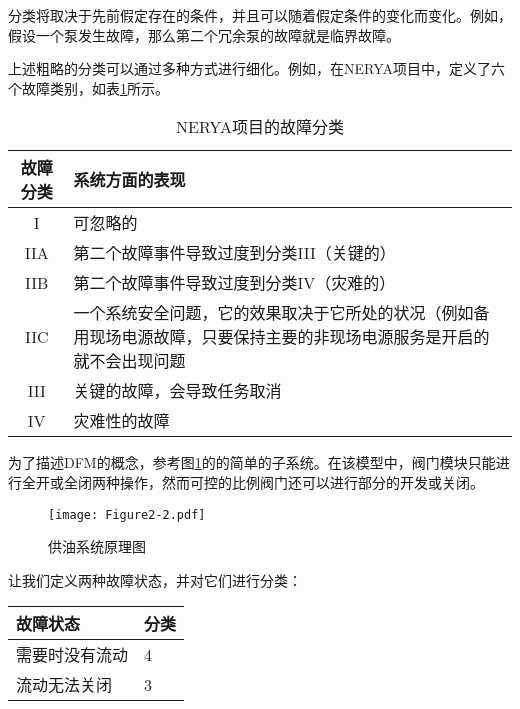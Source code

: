 \documentclass[cn,11pt,chinese]{elegantbook}
\begin{document}
分类将取决于先前假定存在的条件，并且可以随着假定条件的变化而变化。例如，假设一个泵发生故障，那么第二个冗余泵的故障就是临界故障。

上述粗略的分类可以通过多种方式进行细化。例如，在NERYA项目中，定义了六个故障类别，如表\ref{tab:tab2_3}所示。



\begin{table}[h]
\centering
	\caption{NERYA项目的故障分类}\label{tab:tab2_3}
	\begin{tabular}{c p{10cm}}
		\toprule
		故障分类 & 系统方面的表现                                                     \\ \midrule
		I    & 可忽略的                                                        \\
		IIA  & 第二个故障事件导致过度到分类III（关键的）                                      \\
		IIB  & 第二个故障事件导致过度到分类IV（灾难的）                                       \\
		IIC  & 一个系统安全问题，它的效果取决于它所处的状况（例如备用现场电源故障，只要保持主要的非现场电源服务是开启的就不会出现问题 \\
		III  & 关键的故障，会导致任务取消                                               \\
		IV   & 灾难性的故障                                                      \\ \bottomrule
	\end{tabular}
\end{table}

为了描述DFM的概念，参考图\ref{fig:fig2-2}的的简单的子系统。在该模型中，阀门模块只能进行全开或全闭两种操作，然而可控的比例阀门还可以进行部分的开发或关闭。

\begin{figure}[htpb]
	\centering
	\texttt{[image: Figure2-2.pdf]}
	\caption{供油系统原理图}\label{fig:fig2-2}
\end{figure}

让我们定义两种故障状态，并对它们进行分类：


\begin{table}[htpb]
	\centering
	\begin{tabular}{@{}ll@{}}
		\toprule
		故障状态    & 分类 \\ \midrule
		需要时没有流动 & 4  \\
		流动无法关闭  & 3  \\ \bottomrule
	\end{tabular}
\end{table}
\end{document}
